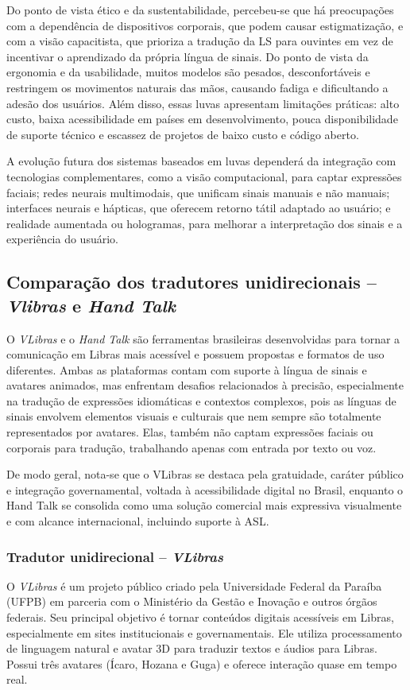 \documentclass[portuguese]{textolivre}
\begin{document}
Do ponto de vista ético e da sustentabilidade, percebeu-se que há preocupações com a dependência de dispositivos corporais, que podem causar estigmatização, e com a visão capacitista, que prioriza a tradução da LS para ouvintes em vez de incentivar o aprendizado da própria língua de sinais. Do ponto de vista da ergonomia e da usabilidade, muitos modelos são pesados, desconfortáveis e restringem os movimentos naturais das mãos, causando fadiga e dificultando a adesão dos usuários. Além disso, essas luvas apresentam limitações práticas: alto custo, baixa acessibilidade em países em desenvolvimento, pouca disponibilidade de suporte técnico e escassez de projetos de baixo custo e código aberto.

A evolução futura dos sistemas baseados em luvas dependerá da integração com tecnologias complementares, como a visão computacional, para captar expressões faciais; redes neurais multimodais, que unificam sinais manuais e não manuais; interfaces neurais e hápticas, que oferecem retorno tátil adaptado ao usuário; e realidade aumentada ou hologramas, para melhorar a interpretação dos sinais e a experiência do usuário.

\subsection{Comparação dos tradutores unidirecionais –\textit{Vlibras} e \textit{Hand Talk}}
O \textit{VLibras }e o \textit{Hand Talk} são ferramentas brasileiras desenvolvidas para tornar a comunicação em Libras mais acessível e possuem propostas e formatos de uso diferentes. Ambas as plataformas contam com suporte à língua de sinais e avatares animados, mas enfrentam desafios relacionados à precisão, especialmente na tradução de expressões idiomáticas e contextos complexos, pois as línguas de sinais envolvem elementos visuais e culturais que nem sempre são totalmente representados por avatares. Elas, também não captam expressões faciais ou corporais para tradução, trabalhando apenas com entrada por texto ou voz.

De modo geral, nota-se que o VLibras se destaca pela gratuidade, caráter público e integração governamental, voltada à acessibilidade digital no Brasil, enquanto o Hand Talk se consolida como uma solução comercial mais expressiva visualmente e com alcance internacional, incluindo suporte à ASL.

\subsubsection{Tradutor unidirecional – \textit{VLibras}}
O \textit{VLibras }é um projeto público criado pela Universidade Federal da Paraíba (UFPB) em parceria com o Ministério da Gestão e Inovação e outros órgãos federais. Seu principal objetivo é tornar conteúdos digitais acessíveis em Libras, especialmente em sites institucionais e governamentais. Ele utiliza processamento de linguagem natural e avatar 3D para traduzir textos e áudios para Libras. Possui três avatares (Ícaro, Hozana e Guga) e oferece interação quase em tempo real.
\end{document}
